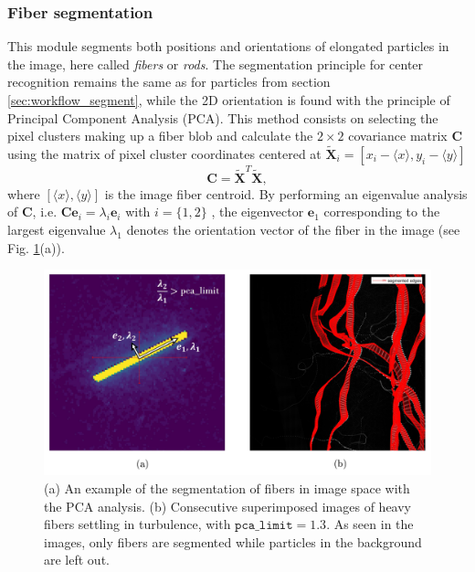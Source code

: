 \documentclass[10pt,a4paper]{article}
\begin{document}
\subsubsection{Fiber segmentation}\label{sec:fibers_segmentation}

This module segments both positions and orientations of elongated particles in the image, here called \textit{fibers} or \textit{rods}. The segmentation principle for center recognition remains the same as for particles from section \ref{sec:workflow_segment}, while the 2D orientation is found with the principle of Principal Component Analysis (PCA). This method consists on selecting the pixel clusters making up a fiber blob and calculate the $2 \times 2$ covariance matrix $\textbf{C}$ using the matrix of pixel cluster coordinates centered at $\widetilde{\textbf{X}}_i = \left[ x_i - \langle x \rangle, y_i - \langle y \rangle \right]$
\begin{equation*}
\textbf{C} = \widetilde{\textbf{X}}^{T} \widetilde{\textbf{X}},
\end{equation*}  
where $[ \langle x \rangle, \langle y \rangle ]$ is the image fiber centroid. By performing an eigenvalue analysis of \textbf{C}, i.e. $\textbf{C}\textbf{e}_{i} = \lambda_{i} \textbf{e}_{i}$ with $i=\{1,2\}$ , the eigenvector $\textbf{e}_{1}$ corresponding to the largest eigenvalue $\lambda_1$  denotes the orientation vector of the fiber in the image (see Fig. \ref{fig:fibers_pca}(a)).



\begin{figure}[ht!]
	\centering
	\includegraphics[width=12cm]{fiber_pca.jpg}
	\caption{(a) An example of the segmentation of fibers in image space with the PCA analysis. (b) Consecutive superimposed images of heavy fibers settling in turbulence, with $\texttt{pca\_limit}=1.3$. As seen in the images, only fibers are segmented while particles in the background are left out. 
	\label{fig:fibers_pca}}
\end{figure}
\end{document}
